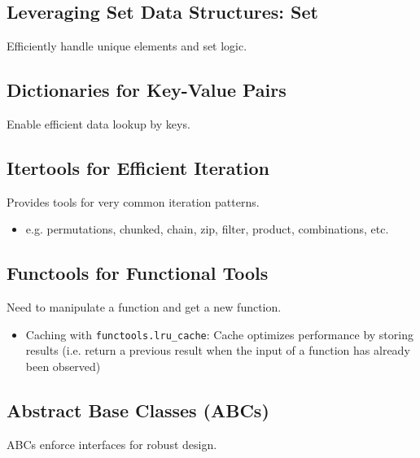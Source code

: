 \subsection{Leveraging Set Data Structures: Set}
\begin{notes}
    Efficiently handle unique elements and set logic.
\end{notes}

\subsection{Dictionaries for Key-Value Pairs}
\begin{notes}
    Enable efficient data lookup by keys.
\end{notes}

\subsection{Itertools for Efficient Iteration}
\begin{notes}
    Provides tools for very common iteration patterns.
    \begin{itemize}
        \item e.g. permutations, chunked, chain, zip, filter, product, combinations, etc.
    \end{itemize}
\end{notes}

\subsection{Functools for Functional Tools}
\begin{notes}
    Need to manipulate a function and get a new function. 
    \begin{itemize}
        \item Caching with \texttt{functools.lru\_cache}: Cache optimizes performance by storing results (i.e. return a previous result when the input of a function has already been observed)
    \end{itemize}
\end{notes}

\subsection{Abstract Base Classes (ABCs)}
\begin{notes}
    ABCs enforce interfaces for robust design.
\end{notes}

